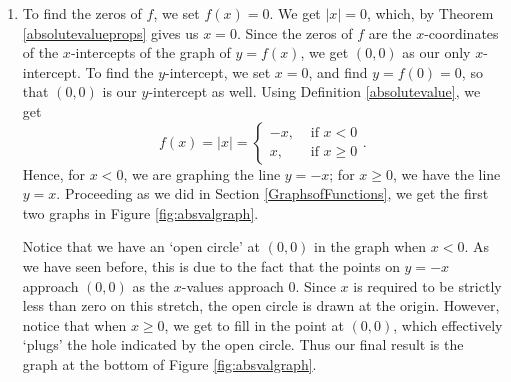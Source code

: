 {
\begin{enumerate}

\item  To find the zeros of $f$, we set $f(x)= 0$.  We get $|x|=0$, which, by Theorem \ref{absolutevalueprops} gives us $x=0$.  Since the zeros of $f$ are the $x$-coordinates of the $x$-intercepts of the graph of $y=f(x)$, we get $(0,0)$ as our only $x$-intercept.  To find the $y$-intercept, we set $x=0$, and find $y = f(0) = 0$, so that $(0,0)$ is our $y$-intercept as well. Using Definition \ref{absolutevalue}, we get 
\[
 f(x) = |x| =  \begin{cases} -x, & \mbox{ if }  x < 0  \\
 							  x, & \mbox{ if }  x \geq 0
 							  
 				\end{cases}.
\]
Hence, for $x < 0$, we are graphing the line $y = -x$;  for $x \geq 0$, we have the line $y = x$.  Proceeding as we did in Section \ref{GraphsofFunctions}, we get the first two graphs in Figure \ref{fig:absvalgraph}.



\smallskip

Notice that we have an `open circle' at $(0,0)$ in the graph when $x<0$. As we have seen before, this is due to the fact that the points on $y = -x$ approach $(0,0)$ as the $x$-values approach $0$.  Since $x$ is required to be strictly less than zero on this stretch, the open circle is drawn at the origin.  However, notice that when $x \geq 0$, we get to fill in the point at $(0,0)$, which effectively `plugs' the hole indicated by the open circle.  Thus our final result is the graph at the bottom of Figure \ref{fig:absvalgraph}.



\end{enumerate}}
